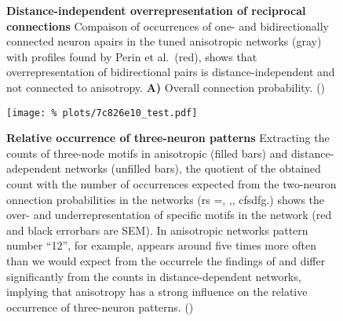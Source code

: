 \begin{figure}[htp]
  \centering
 
  \captionsetup{skip=7pt}
  \caption{\textbf{Distance-independent overrepresentation of
      reciprocal connections} Compaison of occurrences of one- and
    bidirectionally connected neuron apairs in the tuned anisotropic
    networks (gray) with profiles found by Perin et al.~(red), shows
    that overrepresentation of bidirectional pairs is
    distance-independent and not connected to anisotropy.  \textbf{A)}
    Overall connection probability. ()}
  \label{fig:perinadsf}
\end{figure}








\begin{figure}[H]
  \centering
  \texttt{[image: \%
    plots/7c826e10\_test.pdf]} 
  \captionsetup{skip=8pt}
  \caption{\textbf{Relative occurrence of three-neuron patterns}
    Extracting the counts of three-node motifs in anisotropic (filled
    bars) and distance-adependent networks (unfilled bars), the
    quotient of the obtained count with the number of occurrences
    expected from the two-neuron onnection probabilities in the
    networks (rs =, ,, cfsdfg.) shows the over- and underrepresentation of
    specific motifs in the network (red and black errorbars are
    SEM). In anisotropic networks pattern number \enquote{12}, for
    example, appears around five times more often than we would expect
    from the occurrele the findings of
    \textcite{Song2005} and differ significantly from the counts in
    distance-dependent networks, implying that anisotropy has a strong
    influence on the relative occurrence of three-neuron
    patterns. () }
  \label{fig:distance_theory_compare}
\end{figure}



